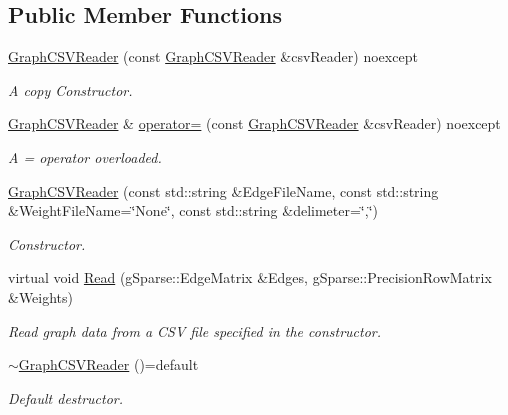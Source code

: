 \subsection*{Public Member Functions}
\begin{DoxyCompactItemize}
\item 
\mbox{\label{classg_sparse_1_1_graph_c_s_v_reader_ac0609b1dbd62f3425d6108caeeafcea7}} 
\mbox{\hyperlink{classg_sparse_1_1_graph_c_s_v_reader_ac0609b1dbd62f3425d6108caeeafcea7}{Graph\+C\+S\+V\+Reader}} (const \mbox{\hyperlink{classg_sparse_1_1_graph_c_s_v_reader}{Graph\+C\+S\+V\+Reader}} \&csv\+Reader) noexcept
\begin{DoxyCompactList}\small\item\em A copy Constructor. \end{DoxyCompactList}\item 
\mbox{\label{classg_sparse_1_1_graph_c_s_v_reader_a9736ef3836d11b7d4cd095b0613410d5}} 
\mbox{\hyperlink{classg_sparse_1_1_graph_c_s_v_reader}{Graph\+C\+S\+V\+Reader}} \& \mbox{\hyperlink{classg_sparse_1_1_graph_c_s_v_reader_a9736ef3836d11b7d4cd095b0613410d5}{operator=}} (const \mbox{\hyperlink{classg_sparse_1_1_graph_c_s_v_reader}{Graph\+C\+S\+V\+Reader}} \&csv\+Reader) noexcept
\begin{DoxyCompactList}\small\item\em A = operator overloaded. \end{DoxyCompactList}\item 
\mbox{\hyperlink{classg_sparse_1_1_graph_c_s_v_reader_a5c95cc40faadeaa36766b05b3b4079d0}{Graph\+C\+S\+V\+Reader}} (const std\+::string \&Edge\+File\+Name, const std\+::string \&Weight\+File\+Name=\char`\"{}None\char`\"{}, const std\+::string \&delimeter=\char`\"{},\char`\"{})
\begin{DoxyCompactList}\small\item\em Constructor. \end{DoxyCompactList}\item 
virtual void \mbox{\hyperlink{classg_sparse_1_1_graph_c_s_v_reader_a01218efe45c694d0b721e737e9c53365}{Read}} (g\+Sparse\+::\+Edge\+Matrix \&Edges, g\+Sparse\+::\+Precision\+Row\+Matrix \&Weights)
\begin{DoxyCompactList}\small\item\em Read graph data from a C\+SV file specified in the constructor. \end{DoxyCompactList}\item 
\mbox{\label{classg_sparse_1_1_graph_c_s_v_reader_a698d7bab55ff0857f264b3a6cc79d02f}} 
\mbox{\hyperlink{classg_sparse_1_1_graph_c_s_v_reader_a698d7bab55ff0857f264b3a6cc79d02f}{$\sim$\+Graph\+C\+S\+V\+Reader}} ()=default
\begin{DoxyCompactList}\small\item\em Default destructor. \end{DoxyCompactList}\end{DoxyCompactItemize}


